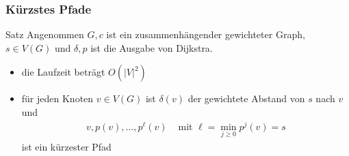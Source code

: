 \documentclass[aspectratio=1610, 11pt]{beamer}
\newcommand{\mytitle}{K\"urzstes Pfade}
\begin{document}
\begin{frame}\frametitle{\mytitle}
	\begin{block}{Satz}
		Angenommen $G,c$ ist ein zusammenh\"angender gewichteter Graph, $s\in V(G)$ und $\delta,p$ ist die Ausgabe von Dijkstra.
		\begin{itemize}
			\item die Laufzeit betr\"agt $O(|V|^2)$
			\item f\"ur jeden Knoten $v\in V(G)$ ist $\delta(v)$ der gewichtete Abstand von $s$ nach $v$ und
				\begin{align*}
					v,p(v),\ldots,p^\ell(v)&\mbox{ mit }\ell=\min_{j\geq0}p^j(v)=s
				\end{align*}
				ist ein k\"urzester Pfad
		\end{itemize}
	\end{block}
\end{frame}
\end{document}
